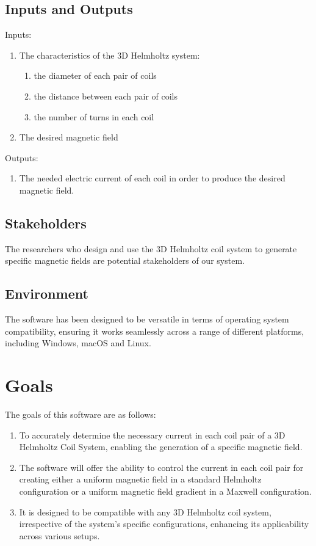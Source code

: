 \documentclass{article}
\begin{document}
\subsection{Inputs and Outputs}

Inputs: 
\begin{enumerate}
    \item The characteristics of the 3D Helmholtz system:
        \begin{enumerate}
            \item the diameter of each pair of coils
            \item the distance between each pair of coils
            \item the number of turns in each coil
        \end{enumerate}
    \item The desired magnetic field
\end{enumerate}
Outputs:
\begin{enumerate}
    \item The needed electric current of each coil in order to produce the desired magnetic field.

\end{enumerate}

\subsection{Stakeholders}
The researchers who design and use the 3D Helmholtz coil system to generate specific magnetic fields are potential stakeholders of our system. 
\subsection{Environment}
The software has been designed to be versatile in terms of operating system compatibility, ensuring it works seamlessly across a range of different platforms, including Windows, macOS and Linux.

\section{Goals}
The goals of this software are as follows:

\begin{enumerate}
    \item  To accurately determine the necessary current in each coil pair of a 3D Helmholtz Coil System, enabling the generation of a specific magnetic field.
    \item The software will offer the ability to control the current in each coil pair for creating either a uniform magnetic field in a standard Helmholtz configuration or a uniform magnetic field gradient in a Maxwell configuration.
    \item It is designed to be compatible with any 3D Helmholtz coil system, irrespective of the system's specific configurations, enhancing its applicability across various setups.
\end{enumerate}
\end{document}
